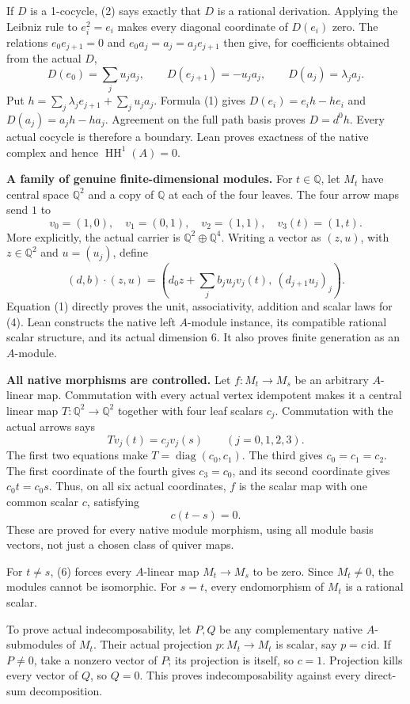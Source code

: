 \documentclass[10pt]{article}
\newcommand{\Q}{\mathbb Q}
\newcommand{\HH}{\operatorname{HH}}
\begin{document}
If $D$ is a 1-cocycle, (2) says exactly that $D$ is a rational derivation.
Applying the Leibniz rule to $e_i^2=e_i$ makes every diagonal coordinate of
$D(e_i)$ zero. The relations $e_0e_{j+1}=0$ and
$e_0a_j=a_j=a_je_{j+1}$ then give, for coefficients obtained from the actual $D$,
\[
 D(e_0)=\sum_j u_ja_j,\qquad D(e_{j+1})=-u_ja_j,
 \qquad D(a_j)=\lambda_ja_j.
\]
Put $h=\sum_j\lambda_je_{j+1}+\sum_j u_ja_j$. Formula (1) gives
$D(e_i)=e_ih-he_i$ and $D(a_j)=a_jh-ha_j$. Agreement on the full path basis
proves $D=d^0h$. Every actual cocycle is therefore a boundary. Lean proves
exactness of the native complex and hence $\HH^1(A)=0$.

\newpage
\textbf{A family of genuine finite-dimensional modules.}
For $t\in\Q$, let $M_t$ have central space $\Q^2$ and a copy of $\Q$ at each
of the four leaves. The four arrow maps send $1$ to
\[
 v_0=(1,0),\quad v_1=(0,1),\quad v_2=(1,1),\quad v_3(t)=(1,t).
 \tag{3}
\]
More explicitly, the actual carrier is $\Q^2\oplus\Q^4$. Writing a vector as
$(z,u)$, with $z\in\Q^2$ and $u=(u_j)$, define
\[
 (d,b)\cdot(z,u)=
 \left(d_0z+\sum_j b_ju_jv_j(t),\ (d_{j+1}u_j)_j\right).
 \tag{4}
\]
Equation (1) directly proves the unit, associativity, addition and scalar laws
for (4). Lean constructs the native left $A$-module instance, its compatible
rational scalar structure, and its actual dimension $6$. It also proves finite
generation as an $A$-module.

\textbf{All native morphisms are controlled.}
Let $f:M_t\to M_s$ be an arbitrary $A$-linear map. Commutation with every
actual vertex idempotent makes it a central linear map $T:\Q^2\to\Q^2$
together with four leaf scalars $c_j$. Commutation with the actual arrows says
\[
 T v_j(t)=c_jv_j(s)\qquad (j=0,1,2,3).
 \tag{5}
\]
The first two equations make $T=\operatorname{diag}(c_0,c_1)$.
The third gives $c_0=c_1=c_2$. The first coordinate of the fourth gives
$c_3=c_0$, and its second coordinate gives $c_0t=c_0s$.
Thus, on all six actual coordinates, $f$ is the scalar map with one common
scalar $c$, satisfying
\[
 c(t-s)=0.
 \tag{6}
\]
These are proved for every native module morphism, using all module basis
vectors, not just a chosen class of quiver maps.

For $t\ne s$, (6) forces every $A$-linear map $M_t\to M_s$ to be zero.
Since $M_t\ne0$, the modules cannot be isomorphic. For $s=t$, every
endomorphism of $M_t$ is a rational scalar.

To prove actual indecomposability, let $P,Q$ be any complementary native
$A$-submodules of $M_t$. Their actual projection $p:M_t\to M_t$ is scalar,
say $p=c\,\mathrm{id}$. If $P\ne0$, take a nonzero vector of $P$; its projection
is itself, so $c=1$. Projection kills every vector of $Q$, so $Q=0$.
This proves indecomposability against every direct-sum decomposition.
\end{document}
